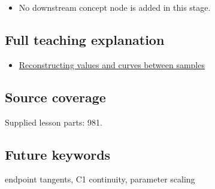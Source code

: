 \begin{itemize}
\tightlist
\item
  No downstream concept node is added in this stage.
\end{itemize}

\subsection{Full teaching explanation}\label{appendix-db3aef8f2fd6-full-teaching-explanation}

\begin{itemize}
\tightlist
\item
  \hyperref[02-foundations-ii-ch028-reconstructing-values-and-curves-between-samples]{Reconstructing values and curves between samples}
\end{itemize}

\subsection{Source coverage}\label{appendix-db3aef8f2fd6-source-coverage}

Supplied lesson parts: 981.

\subsection{Future keywords}\label{appendix-db3aef8f2fd6-future-keywords}

endpoint tangents, C1 continuity, parameter scaling
